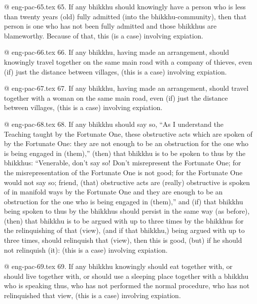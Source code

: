 @ eng-pac-65.tex
65. If any bhikkhu should knowingly have a person who is less than twenty years (old) fully admitted (into the bhikkhu-community), then that person is one who has not been fully admitted and those bhikkhus are blameworthy. Because of that, this (is a case) involving expiation.

@ eng-pac-66.tex
66. If any bhikkhu, having made an arrangement, should knowingly travel together on the same main road with a company of thieves, even (if) just the distance between villages, (this is a case) involving expiation.

@ eng-pac-67.tex
67. If any bhikkhu, having made an arrangement, should travel together with a woman on the same main road, even (if) just the distance between villages, (this is a case) involving expiation.

@ eng-pac-68.tex
68. If any bhikkhu should say so, “As I understand the Teaching taught by the Fortunate One, these obstructive acts which are spoken of by the Fortunate One: they are not enough to be an obstruction for the one who is being engaged in (them),” (then) that bhikkhu is to be spoken to thus by the bhikkhus: “Venerable, don't say so! Don't misrepresent the Fortunate One; for the misrepresentation of the Fortunate One is not good; for the Fortunate One would not say so; friend, (that) obstructive acts are (really) obstructive is spoken of in manifold ways by the Fortunate One and they are enough to be an obstruction for the one who is being engaged in (them),” and (if) that bhikkhu being spoken to thus by the bhikkhus should persist in the same way (as before), (then) that bhikkhu is to be argued with up to three times by the bhikkhus for the relinquishing of that (view), (and if that bhikkhu,) being argued with up to three times, should relinquish that (view), then this is good, (but) if he should not relinquish (it): (this is a case) involving expiation.

@ eng-pac-69.tex
69. If any bhikkhu knowingly should eat together with, or should live together with, or should use a sleeping place together with a bhikkhu who is speaking thus, who has not performed the normal procedure, who has not relinquished that view, (this is a case) involving expiation.

